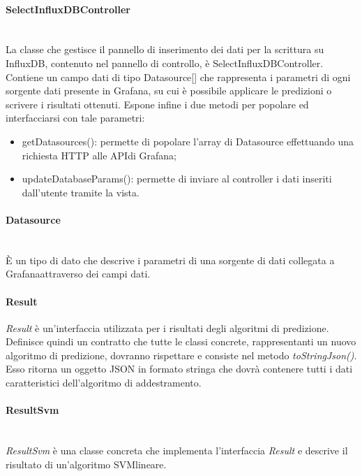 \paragraph*{SelectInfluxDBController} \mbox{}\\ [1mm]
La classe che gestisce il pannello di inserimento dei dati per la scrittura su InfluxDB, contenuto nel pannello di controllo, è SelectInfluxDBController.
Contiene un campo dati di tipo Datasource[] che rappresenta i parametri di ogni sorgente dati presente in Grafana\glo, su cui è possibile applicare le predizioni o scrivere i risultati ottenuti. Espone infine i due metodi per popolare ed interfacciarsi con tale parametri:
\begin{itemize}
	\item getDatasources(): permette di popolare l'array di Datasource effettuando una richiesta HTTP alle API\glosp di Grafana\glo;
	\item updateDatabaseParams(): permette di inviare al controller i dati inseriti dall'utente tramite la vista.
\end{itemize}
\paragraph*{Datasource} \mbox{}\\ [1mm]
È un tipo di dato che descrive i parametri di una sorgente di dati collegata a Grafana\glosp attraverso dei campi dati.
\paragraph*{Result}
\textit{Result} è un'interfaccia utilizzata per i risultati degli algoritmi di predizione. Definisce quindi un contratto che tutte le classi concrete, rappresentanti un nuovo algoritmo di predizione, dovranno rispettare e consiste nel metodo \textit{toStringJson()}. Esso ritorna un oggetto JSON in formato stringa che dovrà contenere tutti i dati caratteristici dell'algoritmo di addestramento.
\paragraph*{ResultSvm} \mbox{}\\ [1mm]
\textit{ResultSvm} è una classe concreta che implementa l'interfaccia \textit{Result} e descrive il risultato di un'algoritmo SVM\glosp lineare.

